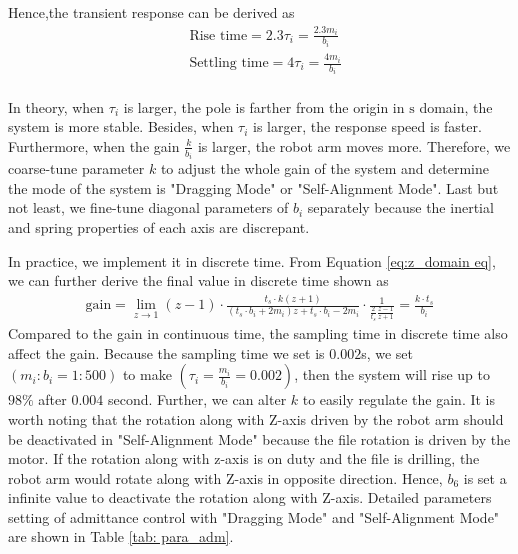 Hence,the transient response can be derived as 
\begin{equation}
\begin{split}
&\text{Rise time} = 2.3\tau_i = \frac{2.3 m_i}{b_i}\\
&\text{Settling time} = 4\tau_i =  \frac{4 m_i}{b_i}\\
\end{split}
\end{equation}
\par
In theory, when $\tau_i$ is larger, the pole is farther from the origin in $\mathrm{s}$ domain, the system is more stable. Besides, when $\tau_i$ is larger, the response speed is faster. Furthermore, when the gain $\frac{k}{b_i}$ is larger, the robot arm moves more. Therefore, we coarse-tune parameter $k$ to adjust the whole gain of the system and determine the mode of the system is "Dragging Mode" or "Self-Alignment Mode". Last but not least, we fine-tune diagonal parameters of $b_i$ separately because the inertial and spring properties of each axis are discrepant. 
\par
In practice, we implement it in discrete time. From Equation \ref{eq:z_domain eq}, we can further derive the final value in discrete time shown as 
\begin{equation}
\begin{split}
\text{gain} = \lim_{z \to 1} (z-1)\cdot \frac{t_s \cdot k(z+1)}{(t_s \cdot b_i+2m_i)z+t_s \cdot b_i-2m_i}\cdot \frac{1}{\frac{2}{t_s}\frac{z-1}{z+1}} = \frac{k\cdot t_s}{b_i}
\end{split}
\end{equation}
Compared to the gain in continuous time, the sampling time in discrete time also affect the gain. Because the sampling time we set is $0.002$s, we set $(m_i : b_i = 1 : 500)$  to make $(\tau _i = \frac{m_i}{b_i} = 0.002)$, then the system will rise up to $98\%$ after $0.004$ second. Further, we can alter $k$ to easily regulate the gain. It is worth noting that the rotation along with Z-axis driven by the robot arm should be deactivated in "Self-Alignment Mode" because the file rotation is driven by the motor. If the rotation along with z-axis is on duty and the file is drilling, the robot arm would rotate along with Z-axis in opposite direction. Hence, $b_6$ is set a infinite value to deactivate the rotation along with Z-axis. Detailed parameters setting of admittance control with "Dragging Mode" and "Self-Alignment Mode" are shown in Table \ref{tab: para_adm}.
